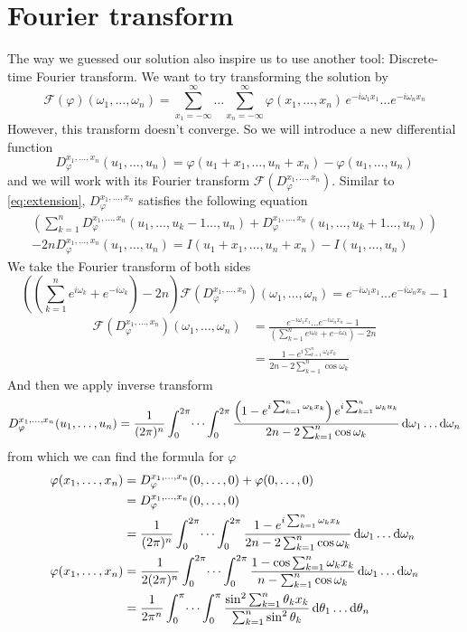 \documentclass[10pt,a4paper,draft]{article}
\begin{document}
\section{Fourier transform}

The way we guessed our solution also inspire us to use another tool: Discrete-time Fourier transform. We want to try transforming the solution by
\[
\mathcal{F}(\varphi)(\omega_1,\dots,\omega_n) = \sum_{x_1=-\infty}^{\infty}\dots\sum_{x_n=-\infty}^{\infty}\varphi(x_1,\dots, x_n)\,e^{-i\omega_1 x_1}\dots e^{-i\omega_n x_n}
\]
However, this transform doesn't converge. So we will introduce a new differential function
\[
D_\varphi^{x_1,\dots,x_n}(u_1,\dots,u_n) = \varphi(u_1+x_1,\dots,u_n+x_n) - \varphi(u_1,\dots,u_n)
\]
and we will work with its Fourier transform $\mathcal{F}(D_\varphi^{x_1,\dots,x_n})$. Similar to \eqref{eq:extension}, $D_\varphi^{x_1,\dots,x_n}$ satisfies the following equation
\begin{align*}
\left(\sum_{k=1}^n D_\varphi^{x_1,\dots,x_n}(u_1,\dots,u_k-1\dots,u_n)+D_\varphi^{x_1,\dots,x_n}(u_1,\dots,u_k+1\dots,u_n)\right) \nonumber \\- 2nD_\varphi^{x_1,\dots,x_n}(u_1,\dots,u_n) = I(u_1+x_1,\dots,u_n+x_n) - I(u_1,\dots,u_n)
\end{align*}
We take the Fourier transform of both sides
\[
\left(\left(\sum_{k=1}^n e^{i\omega_k} + e^{-i\omega_k}\right) - 2n\right)\mathcal{F}(D_\varphi^{x_1,\dots,x_n})(\omega_1,\dots,\omega_n)=e^{-i\omega_1 x_1}\dots e^{-i\omega_n x_n} - 1 
\]
\begin{align*}
\mathcal{F}(D_\varphi^{x_1,\dots,x_n})(\omega_1,\dots,\omega_n) &= \frac{e^{-i\omega_1 x_1}\dots e^{-i\omega_n x_n} - 1 }{\left(\sum_{k=1}^n e^{i\omega_k} + e^{-i\omega_k}\right) - 2n}\\
&=\frac{1-e^{i\sum_{k=1}^n\omega_k x_k}}{2n-2\sum_{k=1}^n\cos\omega_k}
\end{align*}
And then we apply inverse transform
\[
D_\varphi^{x_1,\dots,x_n}(u_1,\dots,u_n) =\frac{1}{(2\pi)^n}\int_0^{2\pi}\dots\int_0^{2\pi}\frac{\left(1-e^{i\sum_{k=1}^n\omega_k x_k}\right)e^{i\sum_{k=1}^n\omega_k u_k}}{2n-2\sum_{k=1}^n\cos\omega_k}\,\mathrm{d}\omega_1\dots\mathrm{d}\omega_n
\]
from which we can find the formula for $\varphi$
\begin{align*}
\varphi(x_1,\dots,x_n) &= D_\varphi^{x_1,\dots,x_n}(0,\dots,0) + \varphi(0,\dots,0) \\
&= D_\varphi^{x_1,\dots,x_n}(0,\dots,0) \\
& = \frac{1}{(2\pi)^n}\int_0^{2\pi}\dots\int_0^{2\pi}\frac{1-e^{i\sum_{k=1}^n\omega_k x_k}}{2n-2\sum_{k=1}^n\cos\omega_k}\,\mathrm{d}\omega_1\dots\mathrm{d}\omega_n\\
\varphi(x_1,\dots,x_n)& = \frac{1}{2(2\pi)^n}\int_0^{2\pi}\dots\int_0^{2\pi}\frac{1-\cos\sum_{k=1}^n\omega_k x_k}{n-\sum_{k=1}^n\cos\omega_k}\,\mathrm{d}\omega_1\dots\mathrm{d}\omega_n\\
& = \frac{1}{2\pi^n}\int_0^{\pi}\dots\int_0^{\pi}\frac{\sin^2\sum_{k=1}^n\theta_k x_k}{\sum_{k=1}^n\sin^2\theta_k}\,\mathrm{d}\theta_1\dots\mathrm{d}\theta_n
\end{align*}
\end{document}

